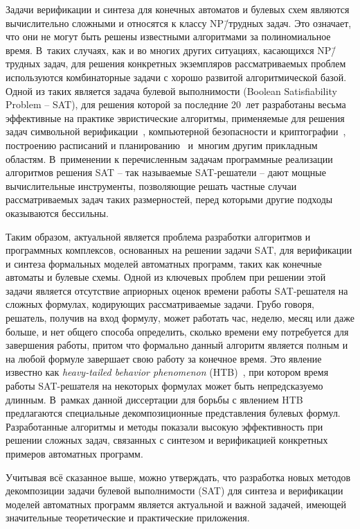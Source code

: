 Задачи верификации и синтеза для конечных автоматов и булевых схем являются вычислительно сложными и относятся к классу NP\=/трудных задач.
Это означает, что они не могут быть решены известными алгоритмами за полиномиальное время.
В~таких случаях, как и во многих других ситуациях, касающихся NP\=/трудных задач, для решения конкретных экземпляров рассматриваемых проблем используются комбинаторные задачи с хорошо развитой алгоритмической базой.
Одной из таких является задача булевой выполнимости (Boolean Satisfiability Problem \--- SAT), для решения которой за последние 20~лет разработаны весьма эффективные на практике эвристические алгоритмы, применяемые для решения задач символьной верификации~\autocite{kroening2021}, компьютерной безопасности и криптографии~\autocite{bard2009}, построению расписаний и планированию~\autocite{prestwich2021} и~многим другим прикладным областям.
В~применении к перечисленным задачам программные реализации алгоритмов решения SAT \--- так называемые SAT-решатели \--- дают мощные вычислительные инструменты, позволяющие решать частные случаи рассматриваемых задач таких размерностей, перед которыми другие подходы оказываются бессильны.

Таким образом, актуальной является проблема разработки алгоритмов и программных комплексов, основанных на решении задачи SAT, для верификации и синтеза формальных моделей автоматных программ, таких как конечные автоматы и булевые схемы.
Одной из ключевых проблем при решении этой задачи является отсутствие априорных оценок времени работы SAT-решателя на сложных формулах, кодирующих рассматриваемые задачи.
Грубо говоря, решатель, получив на вход формулу, может работать час, неделю, месяц или даже больше, и нет общего способа определить, сколько времени ему потребуется для завершения работы, притом что формально данный алгоритм является полным и на любой формуле завершает свою работу за конечное время.
Это явление известно как \textit{heavy-tailed behavior phenomenon} (HTB)~\autocite{gomes2009}, при котором время работы SAT-решателя на некоторых формулах может быть непредсказуемо длинным.
В~рамках данной диссертации для борьбы с явлением HTB предлагаются специальные декомпозиционные представления булевых формул.
Разработанные алгоритмы и методы показали высокую эффективность при решении сложных задач, связанных с синтезом и верификацией конкретных примеров автоматных программ.

Учитывая всё сказанное выше, можно утверждать, что разработка новых методов декомпозиции задачи булевой выполнимости (SAT) для синтеза и верификации моделей автоматных программ является актуальной и важной задачей, имеющей значительные теоретические и практические приложения.



